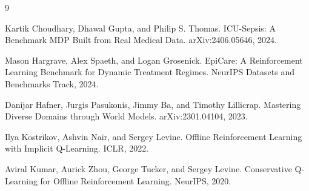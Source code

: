 \documentclass[10pt,twocolumn]{article}
\begin{document}
\begin{thebibliography}{9}

Kartik Choudhary, Dhawal Gupta, and Philip S. Thomas.
\newblock ICU-Sepsis: A Benchmark MDP Built from Real Medical Data.
\newblock arXiv:2406.05646, 2024.

Mason Hargrave, Alex Spaeth, and Logan Grosenick.
\newblock EpiCare: A Reinforcement Learning Benchmark for Dynamic Treatment Regimes.
\newblock NeurIPS Datasets and Benchmarks Track, 2024.

Danijar Hafner, Jurgis Pasukonis, Jimmy Ba, and Timothy Lillicrap.
\newblock Mastering Diverse Domains through World Models.
\newblock arXiv:2301.04104, 2023.

Ilya Kostrikov, Ashvin Nair, and Sergey Levine.
\newblock Offline Reinforcement Learning with Implicit Q-Learning.
\newblock ICLR, 2022.

Aviral Kumar, Aurick Zhou, George Tucker, and Sergey Levine.
\newblock Conservative Q-Learning for Offline Reinforcement Learning.
\newblock NeurIPS, 2020.

\end{thebibliography}
\end{document}
